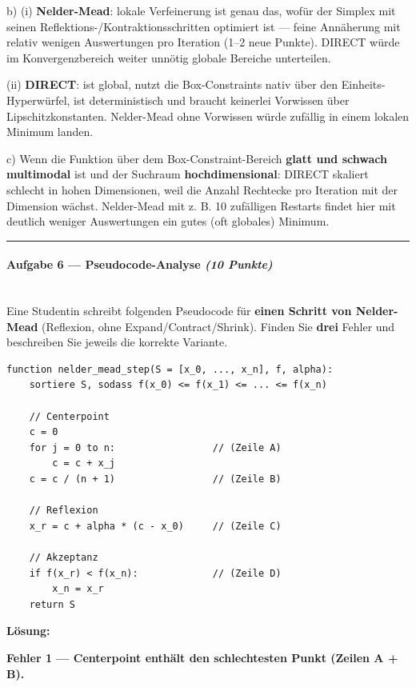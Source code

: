 \documentclass[11pt, a4paper]{article}
\begin{document}
b) (i) \textbf{Nelder-Mead}: lokale Verfeinerung ist genau das, wofür der Simplex mit seinen Reflektions-/Kontraktionsschritten optimiert ist — feine Annäherung mit relativ wenigen Auswertungen pro Iteration (1–2 neue Punkte). DIRECT würde im Konvergenzbereich weiter unnötig globale Bereiche unterteilen.


(ii) \textbf{DIRECT}: ist global, nutzt die Box-Constraints nativ über den Einheits-Hyperwürfel, ist deterministisch und braucht keinerlei Vorwissen über Lipschitzkonstanten. Nelder-Mead ohne Vorwissen würde zufällig in einem lokalen Minimum landen.


c) Wenn die Funktion über dem Box-Constraint-Bereich \textbf{glatt und schwach multimodal} ist und der Suchraum \textbf{hochdimensional}: DIRECT skaliert schlecht in hohen Dimensionen, weil die Anzahl Rechtecke pro Iteration mit der Dimension wächst. Nelder-Mead mit z. B. 10 zufälligen Restarts findet hier mit deutlich weniger Auswertungen ein gutes (oft globales) Minimum.



\noindent\textcolor{rulegray}{\rule{\linewidth}{0.4pt}}


\paragraph{Aufgabe 6 — Pseudocode-Analyse \textit{(10 Punkte)}}\mbox{}\\[2pt]

Eine Studentin schreibt folgenden Pseudocode für \textbf{einen Schritt von Nelder-Mead} (Reflexion, ohne Expand/Contract/Shrink). Finden Sie \textbf{drei} Fehler und beschreiben Sie jeweils die korrekte Variante.


\begin{lstlisting}
function nelder_mead_step(S = [x_0, ..., x_n], f, alpha):
    sortiere S, sodass f(x_0) <= f(x_1) <= ... <= f(x_n)

    // Centerpoint
    c = 0
    for j = 0 to n:                 // (Zeile A)
        c = c + x_j
    c = c / (n + 1)                 // (Zeile B)

    // Reflexion
    x_r = c + alpha * (c - x_0)     // (Zeile C)

    // Akzeptanz
    if f(x_r) < f(x_n):             // (Zeile D)
        x_n = x_r
    return S
\end{lstlisting}


\textbf{Lösung:}


\textbf{Fehler 1 — Centerpoint enthält den schlechtesten Punkt (Zeilen A + B).}
\end{document}
